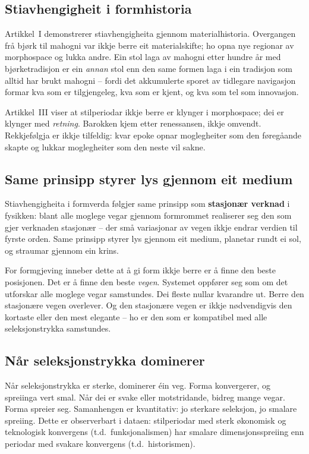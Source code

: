 \documentclass[12pt,a4paper,oneside]{report}
\begin{document}
\subsection{Stiavhengigheit i formhistoria}

Artikkel~I demonstrerer stiavhengigheita gjennom materialhistoria. Overgangen frå bjørk til mahogni var ikkje berre eit materialskifte; ho opna nye regionar av morphospace og lukka andre. Ein stol laga av mahogni etter hundre år med bjørketradisjon er ein \emph{annan} stol enn den same formen laga i ein tradisjon som alltid har brukt mahogni -- fordi det akkumulerte sporet av tidlegare navigasjon formar kva som er tilgjengeleg, kva som er kjent, og kva som tel som innovasjon.

Artikkel~III viser at stilperiodar ikkje berre er klynger i morphospace; dei er klynger med \emph{retning}. Barokken kjem etter renessansen, ikkje omvendt. Rekkjefølgja er ikkje tilfeldig: kvar epoke opnar moglegheiter som den føregåande skapte og lukkar moglegheiter som den neste vil sakne.

\subsection{Same prinsipp styrer lys gjennom eit medium}

Stiavhengigheita i formverda følgjer same prinsipp som \textbf{stasjonær verknad} i fysikken: blant alle moglege vegar gjennom formrommet realiserer seg den som gjer verknaden stasjonær -- der små variasjonar av vegen ikkje endrar verdien til fyrste orden. Same prinsipp styrer lys gjennom eit medium, planetar rundt ei sol, og straumar gjennom ein krins.

For formgjeving inneber dette at å gi form ikkje berre er å finne den beste posisjonen. Det er å finne den beste \emph{vegen}. Systemet oppfører seg som om det utforskar alle moglege vegar samstundes. Dei fleste nullar kvarandre ut. Berre den stasjonære vegen overlever. Og den stasjonære vegen er ikkje nødvendigvis den kortaste eller den mest elegante -- ho er den som er kompatibel med alle seleksjonstrykka samstundes.

\subsection{Når seleksjonstrykka dominerer}

Når seleksjonstrykka er sterke, dominerer éin veg. Forma konvergerer, og spreiinga vert smal. Når dei er svake eller motstridande, bidreg mange vegar. Forma spreier seg. Samanhengen er kvantitativ: jo sterkare seleksjon, jo smalare spreiing. Dette er observerbart i dataen: stilperiodar med sterk økonomisk og teknologisk konvergens (t.d.\ funksjonalismen) har smalare dimensjonsspreiing enn periodar med svakare konvergens (t.d.\ historismen).
\end{document}
